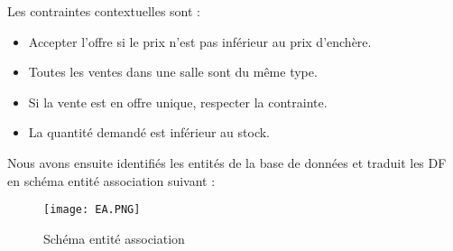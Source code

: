 \documentclass{article}
\begin{document}
\hspace{10mm}

Les contraintes contextuelles sont :
\begin{itemize}
    \item Accepter l'offre si le prix n'est pas inférieur au prix d'enchère.
    \item Toutes les ventes dans une salle sont du même type.
    \item Si la vente est en offre unique, respecter la contrainte.
    \item La quantité demandé est inférieur au stock.
\end{itemize}

Nous avons ensuite identifiés les entités de la base de données et traduit les DF en schéma entité association suivant :
\begin{figure}[h!]
    \centering
    \texttt{[image: EA.PNG]}
    \caption{Schéma entité association}
    \label{fig:enter-label}
\end{figure}
\end{document}
